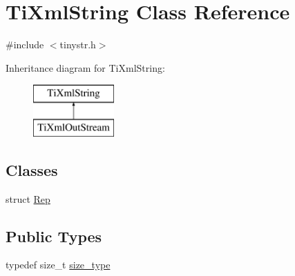 \hypertarget{class_ti_xml_string}{
\section{TiXmlString Class Reference}
\label{class_ti_xml_string}
}


{\ttfamily \#include $<$tinystr.h$>$}

Inheritance diagram for TiXmlString:\begin{figure}[H]
\begin{center}
\leavevmode
\includegraphics[height=2.000000cm]{class_ti_xml_string}
\end{center}
\end{figure}
\subsection*{Classes}
\begin{DoxyCompactItemize}
\item 
struct \hyperlink{struct_ti_xml_string_1_1_rep}{Rep}
\end{DoxyCompactItemize}
\subsection*{Public Types}
\begin{DoxyCompactItemize}
\item 
typedef size\_\-t \hyperlink{class_ti_xml_string_abeb2c1893a04c17904f7c06546d0b971}{size\_\-type}
\end{DoxyCompactItemize}
